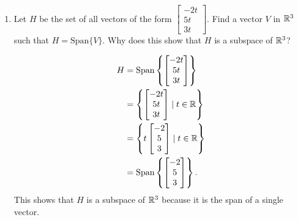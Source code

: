 \documentclass{zc-ust-hw}
\begin{document}
\begin{enumerate}
\begin{enumerate}
      \item Let $H$ be the set of all vectors of the form $\begin{bmatrix} -2t\\5t\\3t \end{bmatrix} $. Find a vector $V$ in $\mathbb{R}^3$ such that $H=\text{Span}\{V\}$. Why does this show that $H$ is a subspace of $\mathbb{R}^3$? 
        \begin{sol}
          \begin{align}
            H &= \text{Span}\left\{ \begin{bmatrix} -2t\\5t\\3t \end{bmatrix} \right\} \\
              &= \left\{ \begin{bmatrix} -2t\\5t\\3t \end{bmatrix} \mid t \in \mathbb{R} \right\} \\
              &= \left\{ t\begin{bmatrix} -2\\5\\3 \end{bmatrix} \mid t \in \mathbb{R} \right\} \\
              &= \text{Span}\left\{ \begin{bmatrix} -2\\5\\3 \end{bmatrix} \right\}
          .\end{align}
          This shows that $H$ is a subspace of $\mathbb{R}^3$ because it is the span of a single vector.
        \end{sol}

    \end{enumerate}

\end{enumerate}
\end{document}
